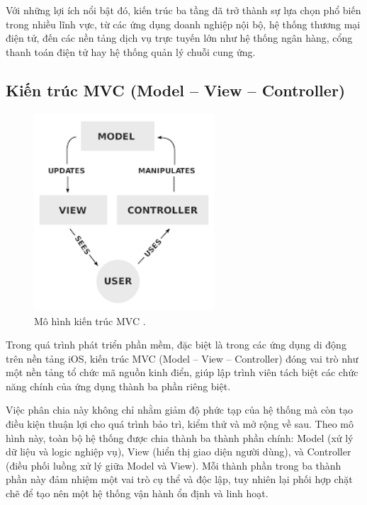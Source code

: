   
  Với những lợi ích nổi bật đó, kiến trúc ba tầng đã trở thành sự lựa chọn phổ biến trong nhiều lĩnh vực, từ các ứng dụng doanh nghiệp nội bộ, hệ thống thương mại điện tử, đến các nền tảng dịch vụ trực tuyến lớn như hệ thống ngân hàng, cổng thanh toán điện tử hay hệ thống quản lý chuỗi cung ứng.

\subsection{Kiến trúc MVC (Model – View – Controller)}
\renewcommand{\labelitemi}{--}    
    
        

    \begin{figure}[H]
      \centering
      \includegraphics[width=0.6\textwidth]{images/mvc.png}
      \caption{Mô hình kiến trúc MVC \cite{daynhauhocMVC}.}
      \label{fig:fig19}
    \end{figure}

    Trong quá trình phát triển phần mềm, đặc biệt là trong các ứng dụng di động trên nền tảng iOS, kiến trúc MVC (Model – View – Controller) đóng vai trò như một nền tảng tổ chức mã nguồn kinh điển, giúp lập trình viên tách biệt các chức năng chính của ứng dụng thành ba phần riêng biệt.
    \vspace{0.5em}
    
      Việc phân chia này không chỉ nhằm giảm độ phức tạp của hệ thống mà còn tạo điều kiện thuận lợi cho quá trình bảo trì, kiểm thử và mở rộng về sau. Theo mô hình này, toàn bộ hệ thống được chia thành ba thành phần chính: Model (xử lý dữ liệu và logic nghiệp vụ), View (hiển thị giao diện người dùng), và Controller (điều phối luồng xử lý giữa Model và View). Mỗi thành phần trong ba thành phần này đảm nhiệm một vai trò cụ thể và độc lập, tuy nhiên lại phối hợp chặt chẽ để tạo nên một hệ thống vận hành ổn định và linh hoạt.
    \vspace{0.5em}


